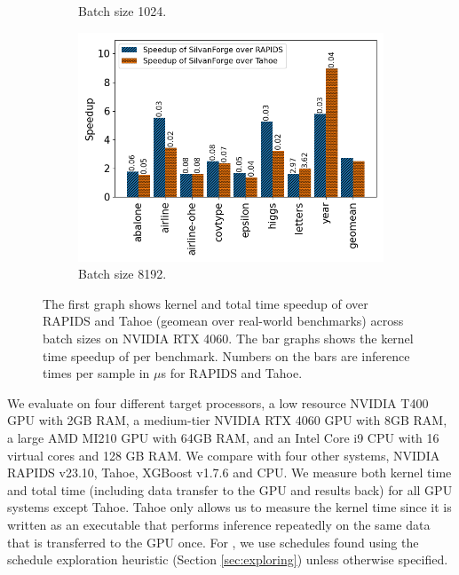 \begin{figure}[htb]
\begin{subfigure}[t]{.32\linewidth}
    \caption{\label{Fig:KernelTimeIndividualBenchmarks4060a} Batch size 1024.}
  \end{subfigure}
  \begin{subfigure}[t]{.32\linewidth}
    \includegraphics[width=\textwidth]{figures/speedup_bar_graph_8192.png}
    \caption{\label{Fig:KernelTimeIndividualBenchmarks4060b} Batch size 8192.}
  \end{subfigure}
  \caption{The first graph shows kernel and total time speedup of \Treebeard{} over RAPIDS and Tahoe (geomean over real-world 
  benchmarks) across batch sizes on NVIDIA RTX 4060. The bar graphs shows the kernel time speedup of \Treebeard{} per benchmark. Numbers on the bars are inference times per sample in $\mu$s for RAPIDS and Tahoe.}
\end{figure}

We evaluate \Treebeard{} on four different target processors, a low resource NVIDIA T400 GPU with 2GB RAM, a medium-tier NVIDIA RTX 4060 GPU with 8GB RAM, a large AMD MI210 GPU with 64GB RAM, and an 
Intel Core i9 CPU  with 16 virtual cores and 128 GB RAM. We compare \Treebeard{} with 
four other systems, NVIDIA RAPIDS\cite{RAPIDS} v23.10, Tahoe\cite{Tahoe}, XGBoost\cite{XGBoost}
v1.7.6 and \TreebeardOLD{}\cite{Treebeard} CPU. 
We measure both kernel time and total time (including data transfer to the GPU and results back) 
for all GPU systems except Tahoe. Tahoe only allows us to measure the kernel time since it is written
as an executable that performs inference repeatedly on the same data that is transferred to the GPU once.
For \Treebeard{}, we use schedules found using the schedule exploration
heuristic (Section \ref{sec:exploring}) unless otherwise specified.

